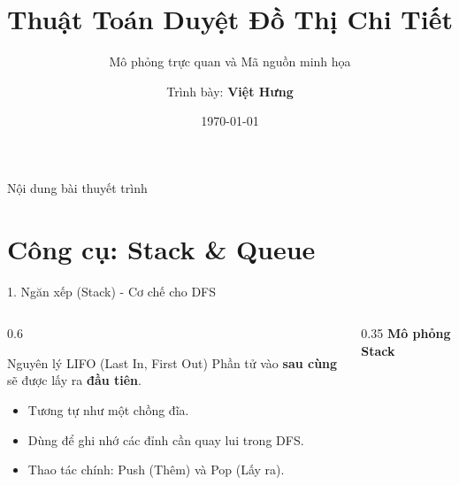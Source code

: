 \documentclass[aspectratio=169]{beamer}
\title[\text{DFS \& BFS}]{Thuật Toán Duyệt Đồ Thị Chi Tiết}
\subtitle{Mô phỏng trực quan và Mã nguồn minh họa}
\author[Việt Hưng]{Trình bày: \textbf{Việt Hưng}}
\institute[Graph Theory]{Khoa Công nghệ Thông tin}
\date{\today}
\begin{document}
\begin{frame}
    \titlepage
\end{frame}

\begin{frame}{Nội dung bài thuyết trình}
    \tableofcontents
\end{frame}

\section{Công cụ: Stack \& Queue}
\begin{frame}{1. Ngăn xếp (Stack) - Cơ chế cho DFS}
    \begin{columns}
        \begin{column}{0.6\textwidth}
            \begin{block}{Nguyên lý LIFO (Last In, First Out)}
                Phần tử vào \textbf{sau cùng} sẽ được lấy ra \textbf{đầu tiên}.
            \end{block}
            \begin{itemize}
                \item Tương tự như một chồng đĩa.
                \item Dùng để ghi nhớ các đỉnh cần quay lui trong DFS.
                \item Thao tác chính: Push (Thêm) và Pop (Lấy ra).
            \end{itemize}
        \end{column}
        \begin{column}{0.35\textwidth}
            \centering \textbf{Mô phỏng Stack}\\
        \end{column}
    \end{columns}
\end{frame}
\end{document}
